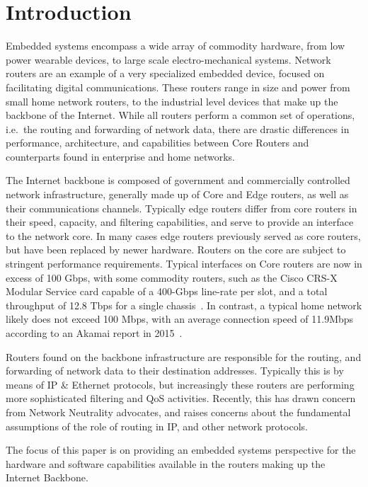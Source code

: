 \section{Introduction}

Embedded systems encompass a wide array of commodity hardware, from low power
wearable devices, to large scale electro-mechanical systems. Network routers
are an example of a very specialized embedded device, focused on facilitating
digital communications. These routers range in size and power from small home
network routers, to the industrial level devices that make up the backbone of
the Internet. While all routers perform a common set of operations, i.e.\ the
routing and forwarding of network data, there are drastic differences in
performance, architecture, and capabilities between Core Routers and
counterparts found in enterprise and home networks.

The Internet backbone is composed of government and commercially controlled
network infrastructure, generally made up of Core and Edge routers, as well as
their communications channels. Typically edge routers differ from core routers
in their speed, capacity, and filtering capabilities, and serve to provide an
interface to the network core. In many cases edge routers previously served as
core routers, but have been replaced by newer hardware. Routers on the core are
subject to stringent performance requirements. Typical interfaces on Core
routers are now in excess of 100 Gbps, with some commodity routers, such as the
Cisco CRS-X Modular Service card capable of a 400-Gbps line-rate per slot, and
a total throughput of 12.8 Tbps for a single chassis~\cite{_cisco_????-1}. In
contrast, a typical home network likely does not exceed 100 Mbps, with an
average connection speed of 11.9Mbps according to an Akamai report in
2015~\cite{gold_u.s._2015}. 

Routers found on the backbone infrastructure are responsible for the routing,
and forwarding of network data to their destination addresses. Typically this
is by means of IP \& Ethernet protocols, but increasingly these routers are
performing more sophisticated filtering and QoS activities. Recently, this has
drawn concern from Network Neutrality advocates, and raises concerns about the
fundamental assumptions of the role of routing in IP, and other network
protocols.



The focus of this paper is on providing an embedded systems perspective for the
hardware and software capabilities available in the routers making up the
Internet Backbone.



